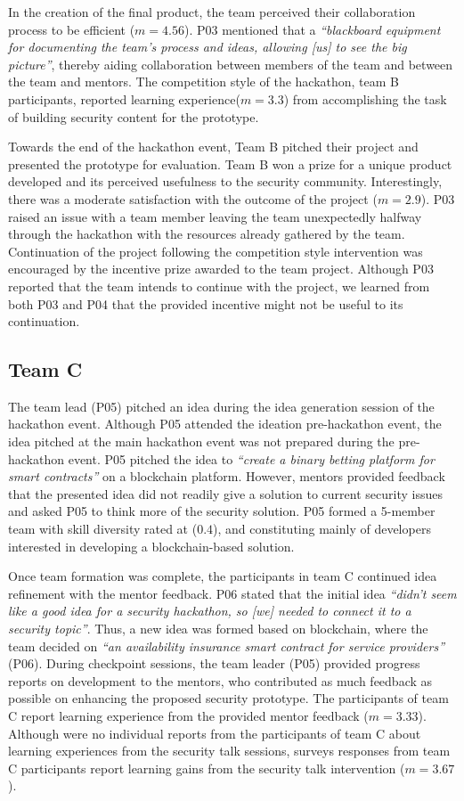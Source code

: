 \documentclass[runningheads]{llncs}
\begin{document}
In the creation of the final product, the team perceived their collaboration process to be efficient ($m = 4.56$). P03 mentioned that a \textit{``blackboard equipment for documenting the team's process and ideas, allowing [us] to see the big picture''}, thereby aiding collaboration between members of the team and between the team and mentors. 
The competition style of the hackathon, team B participants, reported learning experience($m = 3.3$) from accomplishing the task of building security content for the prototype.

Towards the end of the hackathon event, Team B pitched their project and presented the prototype for evaluation. Team B won a prize for a unique product developed and its perceived usefulness to the security community. Interestingly, there was a moderate satisfaction with the outcome of the project ($m = 2.9$). P03 raised an issue with a team member leaving the team unexpectedly halfway through the hackathon with the resources already gathered by the team. Continuation of the project following the competition style intervention was encouraged by the incentive prize awarded to the team project. Although P03 reported that the team intends to continue with the project, we learned from both P03 and P04 that the provided incentive might not be useful to its continuation.


\subsection{Team C}
The team lead (P05) pitched an idea during the idea generation session of the hackathon event. Although P05 attended the ideation pre-hackathon event, the idea pitched at the main hackathon event was not prepared during the pre-hackathon event. P05 pitched the idea to \textit{``create a binary betting platform for smart contracts''} on a blockchain platform. However, mentors provided feedback that the presented idea did not readily give a solution to current security issues and asked P05 to think more of the security solution. P05 formed a 5-member team with skill diversity rated at ($\textit{0.4}$), and constituting mainly of developers interested in developing a blockchain-based solution.

Once team formation was complete, the participants in team C continued idea refinement with the mentor feedback. P06 stated that the initial idea \textit{``didn't seem like a good idea for a security hackathon, so [we] needed to connect it to a security topic''}. Thus, a new idea was formed based on blockchain, where the team decided on \textit{``an availability insurance smart contract for service providers''} (P06). During checkpoint sessions, the team leader (P05) provided progress reports on development to the mentors, who contributed as much feedback as possible on enhancing the proposed security prototype. The participants of team C report learning experience from the provided mentor feedback ($m = 3.33$). Although were no individual reports from the participants of team C about learning experiences from the security talk sessions, surveys responses from team C participants report learning gains from the security talk intervention ($m = 3.67$).
\end{document}
